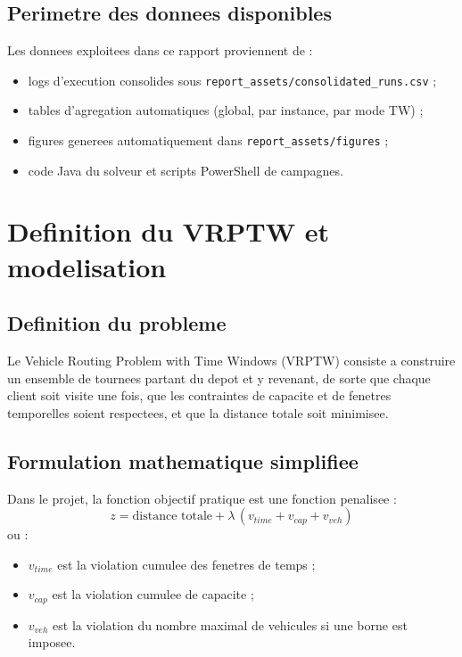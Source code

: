 \documentclass[12pt,a4paper]{report}
\begin{document}
\section{Perimetre des donnees disponibles}
Les donnees exploitees dans ce rapport proviennent de :
\begin{itemize}[leftmargin=1.2cm]
  \item logs d'execution consolides sous \texttt{report\_assets/consolidated\_runs.csv} ;
  \item tables d'agregation automatiques (global, par instance, par mode TW) ;
  \item figures generees automatiquement dans \texttt{report\_assets/figures} ;
  \item code Java du solveur et scripts PowerShell de campagnes.
\end{itemize}

\chapter{Definition du VRPTW et modelisation}

\section{Definition du probleme}
Le Vehicle Routing Problem with Time Windows (VRPTW) consiste a construire un ensemble de tournees
partant du depot et y revenant, de sorte que chaque client soit visite une fois,
que les contraintes de capacite et de fenetres temporelles soient respectees,
et que la distance totale soit minimisee.

\section{Formulation mathematique simplifiee}
Dans le projet, la fonction objectif pratique est une fonction penalisee :
\begin{equation}
z = \text{distance totale}
+ \lambda\,(v_{time}+v_{cap}+v_{veh})
\end{equation}
ou :
\begin{itemize}[leftmargin=1.2cm]
  \item $v_{time}$ est la violation cumulee des fenetres de temps ;
  \item $v_{cap}$ est la violation cumulee de capacite ;
  \item $v_{veh}$ est la violation du nombre maximal de vehicules si une borne est imposee.
\end{itemize}
\end{document}
